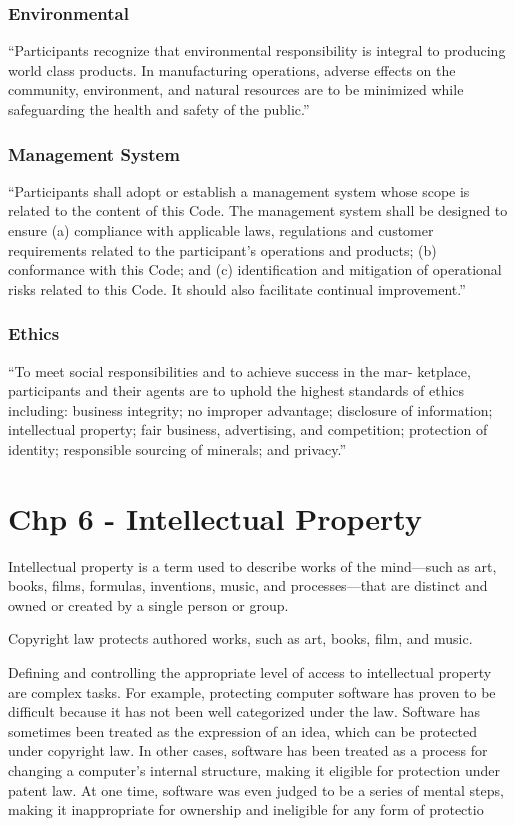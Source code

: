 \documentclass[11pt]{article}
\begin{document}
\subsubsection{Environmental}
\label{sec:orgc6f5fa0}
“Participants recognize that environmental responsibility is integral to producing world class products. In manufacturing operations, adverse effects on the community, environment, and natural resources are to be minimized while safeguarding the health and safety of the public.”
\subsubsection{Management System}
\label{sec:org7826e7b}
“Participants shall adopt or establish a management system whose scope is related to the content of this Code. The management system shall be designed to ensure (a) compliance with applicable laws, regulations and customer requirements related to the participant’s operations and products; (b) conformance with this Code; and (c) identification and mitigation of operational risks related to this Code. It should also facilitate continual improvement.”
\subsubsection{Ethics}
\label{sec:orgdabc08e}
“To meet social responsibilities and to achieve success in the mar- ketplace, participants and their agents are to uphold the highest standards of ethics including: business integrity; no improper advantage; disclosure of information; intellectual property; fair business, advertising, and competition; protection of identity; responsible sourcing of minerals; and privacy.”
\section{Chp 6 - Intellectual Property}
\label{sec:org60af3f2}
Intellectual property is a term used to describe works of the mind—such as art, books, films, formulas, inventions, music, and processes—that are distinct and owned or created by a single person or group.

Copyright law protects authored works, such as art, books, film, and music.

Defining and controlling the appropriate level of access to intellectual property are
complex tasks. For example, protecting computer software has proven to be difficult because
it has not been well categorized under the law. Software has sometimes been treated as the
expression of an idea, which can be protected under copyright law. In other cases, software
has been treated as a process for changing a computer’s internal structure, making it eligible
for protection under patent law. At one time, software was even judged to be a series of
mental steps, making it inappropriate for ownership and ineligible for any form of protectio
\end{document}
